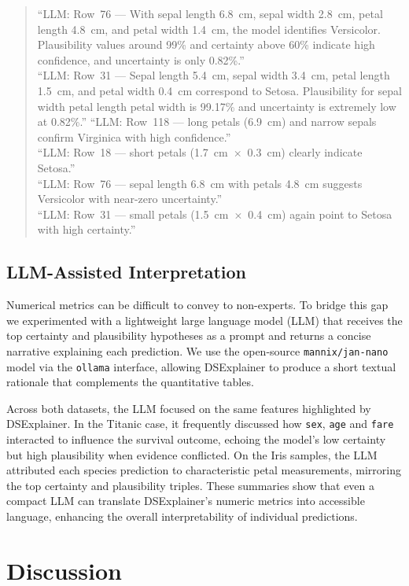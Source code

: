 \documentclass[acmlarge]{acmart}
\begin{document}
\begin{quote}
``LLM: Row~76 --- With sepal length 6.8~cm, sepal width 2.8~cm, petal length 4.8~cm, and petal width 1.4~cm, the model identifies Versicolor. Plausibility values around 99\% and certainty above 60\% indicate high confidence, and uncertainty is only 0.82\%.''\\
``LLM: Row~31 --- Sepal length 5.4~cm, sepal width 3.4~cm, petal length 1.5~cm, and petal width 0.4~cm correspond to Setosa. Plausibility for sepal width \times petal length \times petal width is 99.17\% and uncertainty is extremely low at 0.82\%.''
``LLM: Row~118 --- long petals (6.9~cm) and narrow sepals confirm Virginica with high confidence.''\\
``LLM: Row~18 --- short petals (1.7~cm~$\times$~0.3~cm) clearly indicate Setosa.''\\
``LLM: Row~76 --- sepal length 6.8~cm with petals 4.8~cm suggests Versicolor with near-zero uncertainty.''\\
``LLM: Row~31 --- small petals (1.5~cm~$\times$~0.4~cm) again point to Setosa with high certainty.''
\end{quote}
\subsection{LLM-Assisted Interpretation}

Numerical metrics can be difficult to convey to non-experts. To bridge this gap we experimented with a lightweight large language model (LLM) that receives the top certainty and plausibility hypotheses as a prompt and returns a concise narrative explaining each prediction. We use the open-source \texttt{mannix/jan-nano} model via the \texttt{ollama} interface, allowing DSExplainer to produce a short textual rationale that complements the quantitative tables.

Across both datasets, the LLM focused on the same features highlighted by DSExplainer. In the Titanic case, it frequently discussed how \texttt{sex}, \texttt{age} and \texttt{fare} interacted to influence the survival outcome, echoing the model's low certainty but high plausibility when evidence conflicted. On the Iris samples, the LLM attributed each species prediction to characteristic petal measurements, mirroring the top certainty and plausibility triples. These summaries show that even a compact LLM can translate DSExplainer's numeric metrics into accessible language, enhancing the overall interpretability of individual predictions.


\section{Discussion}
\end{document}
